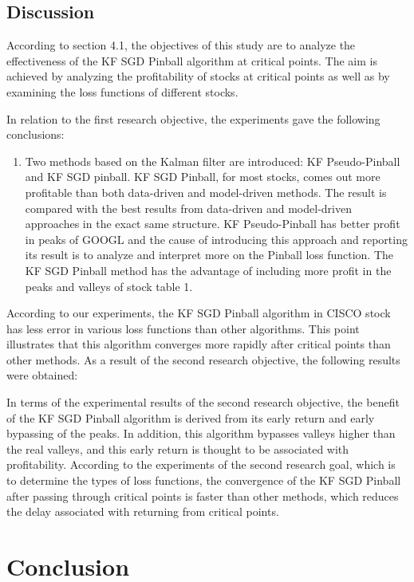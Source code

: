 \documentclass[12pt,a4paper]{article}
\begin{document}
	\subsection{Discussion}
	
	According to section 4.1, the objectives of this study are to analyze the effectiveness of the KF SGD Pinball algorithm at critical points. The aim is achieved by analyzing the profitability of stocks at critical points as well as by examining the loss functions of different stocks.
	
	In relation to the first research objective, the experiments gave the following conclusions:
	
	\begin{enumerate}
		\item Two methods based on the Kalman filter are introduced: KF Pseudo-Pinball and KF SGD pinball. KF SGD Pinball, for most stocks, comes out more profitable than both data-driven and model-driven methods. The result is compared with the best results from data-driven and model-driven approaches in the exact same structure. KF Pseudo-Pinball has better profit in peaks of GOOGL and the cause of introducing this approach and reporting its result is to analyze and interpret more on the Pinball loss function. The KF SGD Pinball method has the advantage of including more profit in the peaks and valleys of stock table 1.
	\end{enumerate}
	
	According to our experiments, the KF SGD Pinball algorithm in CISCO stock has less error in various loss functions than other algorithms. This point illustrates that this algorithm converges more rapidly after critical points than other methods. As a result of the second research objective, the following results were obtained:
	
	In terms of the experimental results of the second research objective, the benefit of the KF SGD Pinball algorithm is derived from its early return and early bypassing of the peaks. In addition, this algorithm bypasses valleys higher than the real valleys, and this early return is thought to be associated with profitability. According to the experiments of the second research goal, which is to determine the types of loss functions, the convergence of the KF SGD Pinball after passing through critical points is faster than other methods, which reduces the delay associated with returning from critical points.
	
	\section{Conclusion}
	
\end{document}
